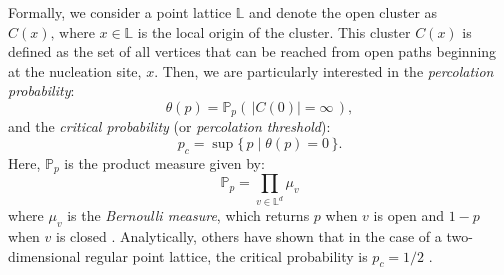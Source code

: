 \documentclass[../report.tex]{subfiles}
\begin{document}
Formally, we consider a point lattice $\mathbb{L}$ and denote the open cluster as $C(x)\text{,~where~}x\in\mathbb{L}$ is the local origin of the cluster. This cluster $C(x)$ is defined as the set of all vertices that can be reached from open paths beginning at the nucleation site, $x$. Then, we are particularly interested in the \emph{percolation probability}:
$$
\theta(p) = \mathbb{P}_p(\,|C(0)|=\infty\,),
$$
and the \emph{critical probability} (or \emph{percolation threshold}):
$$
p_c = \sup\{\,p \mid \theta(p)=0\,\}.
$$
Here, $\mathbb{P}_p$ is the product measure given by:
$$
\displaystyle \mathbb{P}_p=\prod_{v\in\mathbb{L}^d}\mu_v
$$
where $\mu_v$ is the \emph{Bernoulli measure}, which returns $p$ when $v$ is open and $1-p$ when $v$ is closed \cite[p. 28]{klenke_2014}. Analytically, others have shown that in the case of a two-dimensional regular point lattice, the critical probability is $p_c=1/2$ \cite{kersten_1980}.
\end{document}
